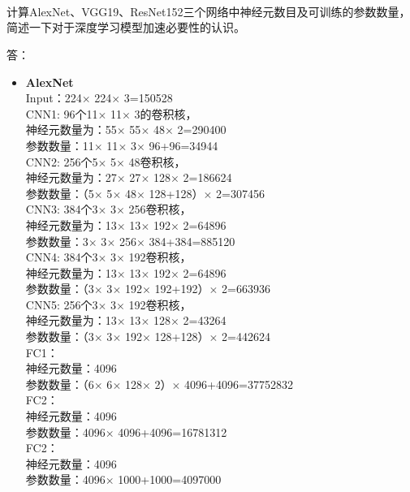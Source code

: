 \documentclass{homework}
\begin{document}
~\\ 
~\\ 
~\\ 
\question \large{计算AlexNet、VGG19、ResNet152三个网络中神经元数目及可训练的参数数量，简述一下对于深度学习模型加速必要性的认识。}

\normalsize 
答：\begin{itemize}
	\item  \textbf{AlexNet} \\ 
	Input：224$\times$ 224$\times$ 3=150528\\ 
	CNN1: 96个11$\times$ 11$\times$ 3的卷积核，\\ 
	神经元数量为：55$\times$ 55$\times$ 48$\times$ 2=290400\\ 
	参数数量：11$\times$ 11$\times$ 3$\times$ 96+96=34944\\ 
	CNN2: 256个5$\times$ 5$\times$ 48卷积核，\\ 
	神经元数量为：27$\times$ 27$\times$ 128$\times$ 2=186624\\ 
	参数数量：（5$\times$ 5$\times$ 48$\times$ 128+128）$\times$ 2=307456\\ 
	CNN3: 384个3$\times$ 3$\times$ 256卷积核，\\ 
	神经元数量为：13$\times$ 13$\times$ 192$\times$ 2=64896\\ 
	参数数量：3$\times$ 3$\times$ 256$\times$ 384+384=885120\\ 
	CNN4: 384个3$\times$ 3$\times$ 192卷积核，\\ 
	神经元数量为：13$\times$ 13$\times$ 192$\times$ 2=64896\\ 
	参数数量：（3$\times$ 3$\times$ 192$\times$ 192+192）$\times$ 2=663936\\ 
	CNN5: 256个3$\times$ 3$\times$ 192卷积核，\\ 
	神经元数量为：13$\times$ 13$\times$ 128$\times$ 2=43264\\ 
	参数数量：（3$\times$ 3$\times$ 192$\times$ 128+128）$\times$ 2=442624\\ 
	FC1： \\ 
	神经元数量：4096\\ 
	参数数量：（6$\times$ 6$\times$ 128$\times$ 2）$\times$ 4096+4096=37752832\\ 
	FC2：\\  
	神经元数量：4096\\ 
	参数数量：4096$\times$ 4096+4096=16781312\\ 
	FC2： \\ 
	神经元数量：4096\\ 
	参数数量：4096$\times$ 1000+1000=4097000\\ 

\end{itemize}
\end{document}
